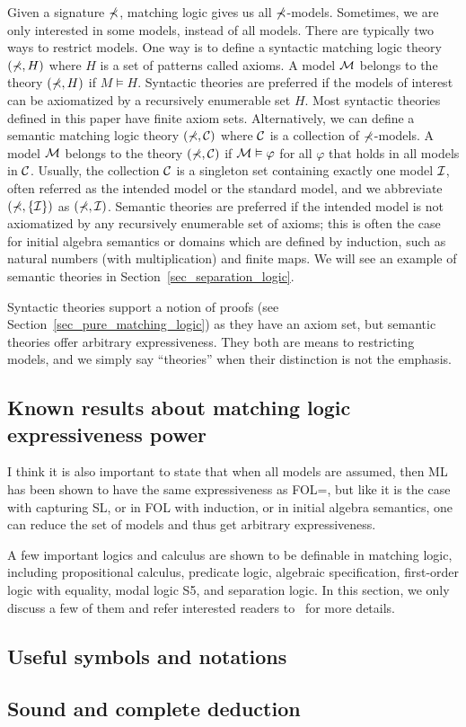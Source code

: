 Given a signature $\mathbb{\Sigma}$, matching logic gives us all $\mathbb{\Sigma}$-models.
Sometimes, we are only interested in some models, instead of all models.
There are typically two ways to restrict models.
One way is to define a syntactic matching logic theory
$(\mathbb{\Sigma}, H)$ where $H$ is a set of patterns called axioms.
A model $\mathcal{M}$ belongs to the theory $(\mathbb{\Sigma}, H)$ if $M \vDash H$.
Syntactic theories are preferred if the models of interest can be
axiomatized by a recursively enumerable set $H$.
Most syntactic theories defined in this paper have finite axiom sets.
Alternatively, we can define a semantic matching logic theory
$(\mathbb{\Sigma}, \mathcal{C})$ where $\mathcal{C}$ is a collection of $\mathbb{\Sigma}$-models.
A model $\mathcal{M}$ belongs to the theory $(\mathbb{\Sigma}, \mathcal{C})$ if
$\mathcal{M} \vDash \varphi$ for all $\varphi$ that holds in all models in $\mathcal{C}$.
Usually, the collection $\mathcal{C}$ is a singleton set containing exactly one model 
$\mathcal{I}$,
often referred as the intended model or the standard model,
and we abbreviate $(\mathbb{\Sigma}, \{ \mathcal{I} \})$ as $(\mathbb{\Sigma}, \mathcal{I})$.
Semantic theories are preferred if the intended model is not axiomatized by any
recursively enumerable set of axioms;
this is often the case for 
initial algebra semantics or domains which are defined by induction, such as
natural numbers (with multiplication) and finite maps.
We will see an example of semantic theories in 
Section~\ref{sec_separation_logic}.

Syntactic theories support a notion of proofs (see 
Section~\ref{sec_pure_matching_logic})
as they have an axiom set,
but semantic theories offer arbitrary expressiveness.
They both are means to restricting models,
and we simply say ``theories'' when their distinction is not the emphasis.





\subsection{Known results about matching logic expressiveness power}

{
I think it is also important to state that when all models are assumed, 
then ML has been shown to have the same expressiveness as FOL=, 
but like it is the case with capturing SL, 
or in FOL with induction, 
or in initial algebra semantics, 
one can reduce the set of models and thus get arbitrary expressiveness.
}



A few important logics and calculus are shown to be definable 
in matching logic, including
propositional calculus, predicate logic,
algebraic specification, first-order logic with equality,
modal logic S5, and separation logic.
In this section, we only discuss a few of them and refer interested readers
to~\cite{bibid} for more details.

\subsection{Useful symbols and notations}

\subsection{Sound and complete deduction}

